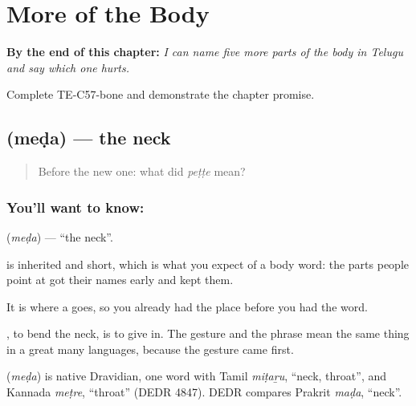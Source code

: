 
\chapter{More of the Body}
\label{ch:te-more-body}

\begin{chapteropening}
\textbf{By the end of this chapter:} \emph{I can name five more parts of the body in Telugu and say which one hurts.}

Complete TE-C57-bone and demonstrate the chapter promise.
\end{chapteropening}

\section[\texorpdfstring{\te{మెడ} (meḍa)}{మెడ (meḍa)}]{ (meḍa) — the neck}

\label{lesson:TE-C57-neck}



\begin{quote}
Before the new one: what did \emph{peṭṭe} mean?
\end{quote}

\subsection*{You'll want to know: }
\textbf{} (\emph{meḍa}) — \textquotedblleft{}the neck\textquotedblright{}.

 is inherited and short, which is what you expect of a body word: the parts people point at got their names early and kept them.

It is where a  goes, so you already had the place before you had the word.

 , to bend the neck, is to give in. The gesture and the phrase mean the same thing in a great many languages, because the gesture came first.

\begin{cousinweb}
\textbf{} (\emph{meḍa}) is native Dravidian, one word with Tamil \emph{miṭaṟu}, \textquotedblleft{}neck, throat\textquotedblright{}, and Kannada \emph{meṭre}, \textquotedblleft{}throat\textquotedblright{} (DEDR 4847). DEDR compares Prakrit \emph{maḍa}, \textquotedblleft{}neck\textquotedblright{}.
\end{cousinweb}

